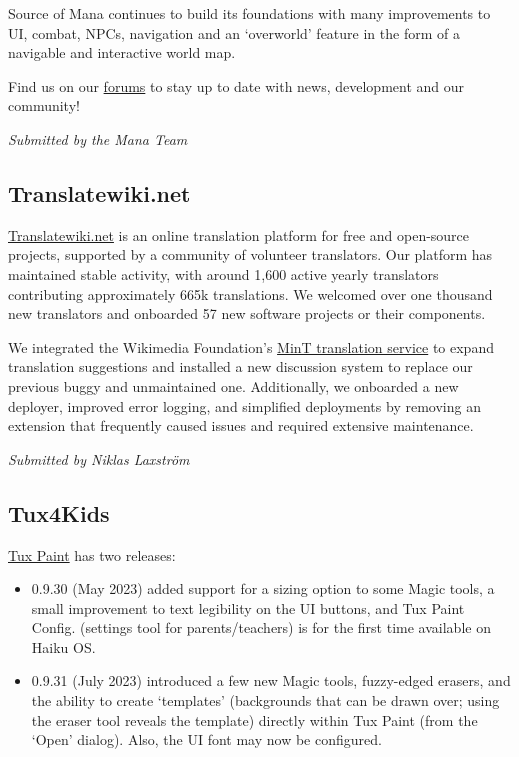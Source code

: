 \documentclass[a4paper]{report}
\begin{document}
Source of Mana continues to build its foundations with many improvements to UI, combat, NPCs, navigation and an `overworld' feature in the form of a navigable and interactive world map.

Find us on our \href{https://forums.themanaworld.org/}{forums} to stay up to date with news, development and our community!

{\em Submitted by the Mana Team}

\subsection{Translatewiki.net}

\href{https://translatewiki.net/}{Translatewiki.net} is an online translation platform for free and open-source projects, supported by a community of volunteer translators.  Our platform has maintained stable activity, with around 1,600 active yearly translators contributing approximately 665k translations. We welcomed over one thousand new translators and onboarded 57 new software projects or their components.

We integrated the Wikimedia Foundation's \href{https://www.mediawiki.org/wiki/MinT}{MinT translation service} to expand translation suggestions and installed a new discussion system to replace our previous buggy and unmaintained one. Additionally, we onboarded a new deployer, improved error logging, and simplified deployments by removing an extension that frequently caused issues and required extensive maintenance.

{\em Submitted by Niklas Laxström}

\subsection{Tux4Kids}

\href{https://tuxpaint.org/}{Tux Paint} has two releases:

\begin{itemize}

\item 0.9.30 (May 2023) added support for a sizing option to some Magic tools, a small improvement to text legibility on the UI buttons, and Tux Paint Config. (settings tool for parents/teachers) is for the first time available on Haiku OS.

\item 0.9.31 (July 2023) introduced a few new Magic tools, fuzzy-edged erasers, and the ability to create `templates' (backgrounds that can be drawn over; using the eraser tool reveals the template) directly within Tux Paint (from the `Open' dialog).  Also, the UI font may now be configured.

\end{itemize}
\end{document}
